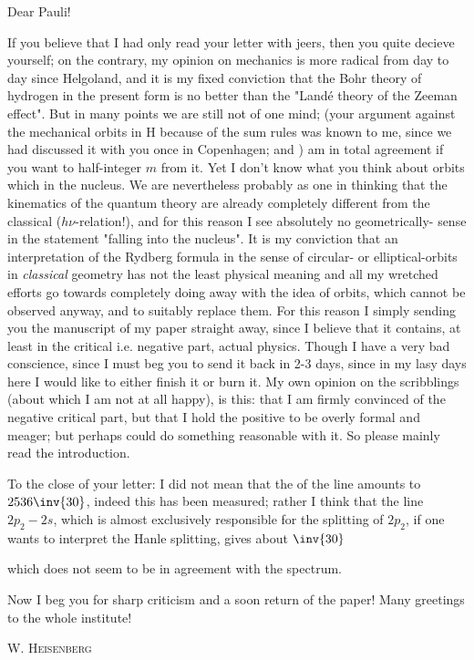 \date{July 9, 1925}

Dear Pauli!

If you believe that I had only read your letter with jeers, then you quite decieve yourself; on the contrary, my opinion on mechanics is more radical from day to day since Helgoland, and it is my fixed conviction that the Bohr theory of hydrogen in the present form is no better than the "Land\'e theory of the Zeeman effect". But in many points we are still not of one mind; (your argument against the mechanical orbits in H because of the sum rules was known to me, since we had discussed it with you once in Copenhagen; and ) am in total agreement if you want to  half-integer $m$ from it. Yet I don't know what you think about orbits which  in the nucleus. We are nevertheless probably as one in thinking that the kinematics of the quantum theory are already completely different from the classical ($h\nu$-relation!), and for this reason I see absolutely no geometrically- sense in the statement "falling into the nucleus". It is my conviction that an interpretation of the Rydberg formula in the sense of circular- or elliptical-orbits in \textit{classical} geometry has not the least physical meaning and all my wretched efforts go towards completely doing away with the idea of orbits, which cannot be observed anyway, and to suitably replace them. For this reason I  simply sending you the manuscript of my paper straight away, since I believe that it contains, at least in the critical i.e. negative part, actual physics. Though I have a very bad conscience, since I must beg you to send it back in 2-3 days, since in my lasy days here I would like to either finish it or burn it. My own opinion on the scribblings (about which I am not at all happy), is this: that I am firmly convinced of the negative critical part, but that I hold the positive to be overly formal and meager; but perhaps  could do something reasonable with it. So please mainly read the introduction.

To the close of your letter: I did not mean that the  of the line amounts to $2536\inv{30}$, indeed this has been measured; rather I think that the line $2p_2 - 2s$, which is almost exclusively responsible for the splitting of $2p_2$, if one wants to interpret the Hanle splitting, gives about $\inv{30}$

which does not seem to be in agreement with the spectrum.

Now I beg you for sharp criticism and a soon return of the paper! Many greetings to the whole institute!

\textsc{W. Heisenberg}

